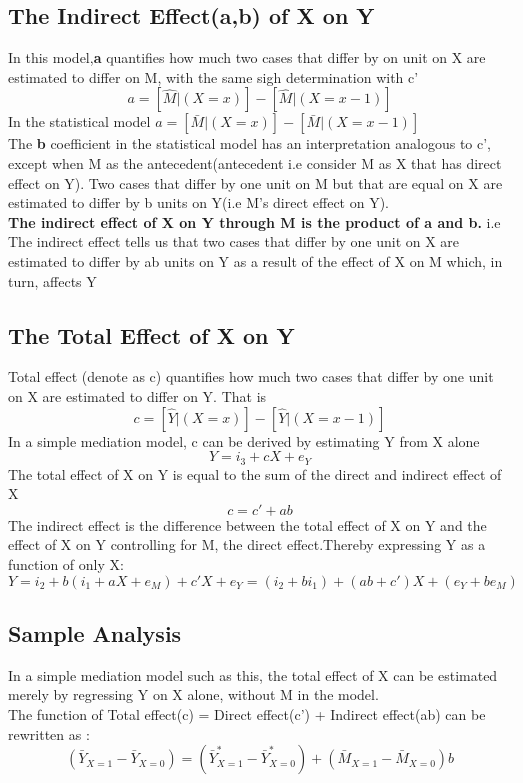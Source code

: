 \documentclass{article}
\theoremstyle{definition}
\begin{document}
\subsection{The Indirect Effect(a,b) of X on Y}
In this model,\textbf{a} quantifies how much two cases that differ by on unit on X are estimated to differ on M, with the same sigh determination with c'
\begin{equation*}
 	a = [\hat{M}|(X=x)]-[\hat{M}|(X=x-1)]
\end{equation*}
In the statistical model $a = [\bar{M}|(X=x)]-[\bar{M}|(X=x-1)]$\\
The \textbf{b} coefficient in the statistical model has an interpretation analogous to c', except when M as the antecedent(antecedent i.e consider M as X that has direct effect on Y). Two cases that differ by one unit on M but that are equal on X are estimated to differ by b units on Y(i.e M's direct effect on Y).\\
\textbf{The indirect effect of X on Y through M is the product of a and b.} i.e The  indirect effect tells us that two cases that differ by one unit on X are estimated to differ by ab units on Y as a result of the effect of X on M which, in turn, affects Y
\subsection{The Total Effect of X on Y}
Total effect (denote as c) quantifies how much two cases that differ by one unit on X are estimated to differ on Y. That is 
\begin{equation*}
	c = [\hat{Y}| (X=x)] - [\hat{Y}|(X=x-1)]
\end{equation*}
In a simple mediation model, c can be derived by estimating Y from X alone
\begin{equation*}
	Y = i_3+cX+e_Y
\end{equation*}
The total effect of X on Y is equal to the sum of the direct and indirect effect of X
\begin{equation*}
	c = c'+ab
\end{equation*}
The indirect effect is the difference between the total effect of X on Y and the effect of X on Y controlling for M, the direct effect.Thereby expressing Y as a function of only X:
\begin{equation*}
	Y = i_2+b(i_1+aX+e_M)+c'X+e_Y = (i_2+bi_1) + (ab + c')X + (e_Y+be_M)
\end{equation*}
\subsection{Sample Analysis}
In a simple mediation model such as this, the total effect of X can be estimated merely by regressing Y on X alone, without M in the model.\\
The function of Total effect(c) = Direct effect(c') + Indirect effect(ab) can be rewritten as :
\begin{equation*}
	(\bar{Y}_{X=1} - \bar{Y}_{X=0}) = (\bar{Y}_{X=1}^* - \bar{Y}_{X=0}^*) + (\bar{M}_{X=1} - \bar{M}_{X=0})b
\end{equation*}
\end{document}
